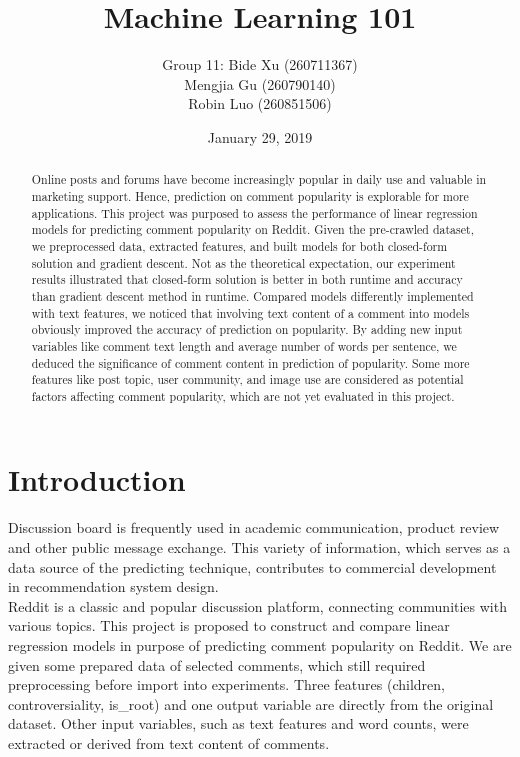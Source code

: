 \documentclass[12pt]{article}
\title{\Huge Machine Learning 101}
\author{Group 11: Bide Xu (260711367)\\Mengjia Gu (260790140)\\Robin Luo (260851506)}
\date{\normalsize January 29, 2019}
\begin{document}
\begin{titlingpage}
\maketitle
\end{titlingpage}

\newpage
\begin{abstract}
Online posts and forums have become increasingly popular in daily use and valuable in marketing support. Hence, prediction on comment popularity is explorable for more applications. This project was purposed to assess the performance of linear regression models for predicting comment popularity on Reddit. Given the pre-crawled dataset, we preprocessed data, extracted features, and built models for both closed-form solution and gradient descent. Not as the theoretical expectation, our experiment results illustrated that closed-form solution is better in both runtime and accuracy than gradient descent method in runtime. Compared models differently implemented with text features, we noticed that involving text content of a comment into models obviously improved the accuracy of prediction on popularity. By adding new input variables like comment text length and average number of words per sentence, we deduced the significance of comment content in prediction of popularity. Some more features like post topic, user community, and image use are considered as potential factors affecting comment popularity, which are not yet evaluated in this project.
\end{abstract}

\section*{Introduction}
Discussion board is frequently used in academic communication, product review and other public message exchange. This variety of information, which serves as a data source of the predicting technique, contributes to commercial development in recommendation system design. \cite{rohlin}\\

Reddit is a classic and popular discussion platform, connecting communities with various topics. \cite{reddit} This project is proposed to construct and compare linear regression models in purpose of predicting comment popularity on Reddit. We are given some prepared data of selected comments, which still required preprocessing before import into experiments. Three features (children, controversiality, is\_root) and one output variable are directly from the original dataset. Other input variables, such as text features and word counts, were extracted or derived from text content of comments.\\
\end{document}

